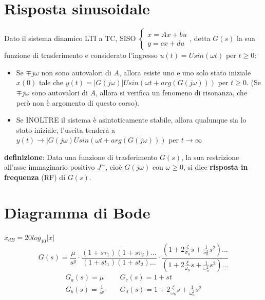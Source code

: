     \section{Risposta sinusoidale}
    Dato il sistema dinamico LTI a TC, SISO $\begin{cases}
        \dot{x} = Ax +bu\\ 
        y = cx +du
    \end{cases}$, detta $G(s)$ la sua funzione di trasferimento e considerato l'ingresso $u(t) = U sin(\omega t)$ per $t\geq 0$:
    \begin{itemize}
        \item Se $\mp j \omega$ non sono autovalori di $A$, allora esiste uno e uno solo stato iniziale $x(0)$ tale che $y(t) = |G(j \omega)| U sin(\omega t + arg(G(j \omega)))$ per $t\geq 0$. (Se $\mp j \omega$ sono autovalori di $A$, allora si verifica un fenomeno di risonanza, che però non è argomento di questo corso).
        \item Se INOLTRE il sistema è asintoticamente stabile, allora qualunque sia lo stato iniziale, l'uscita  tenderà a $y(t) \rightarrow |G(j \omega) U sin( \omega t + arg(G(j \omega)))$ per $t \rightarrow  \infty$
    \end{itemize}
    \textbf{definizione}:  Data una funzione di trasferimento $G(s)$, la sua restrizione all'asse immaginario positivo $J^+$, cioè $G(j \omega)$ con $\omega \geq 0$, si dice \textbf{risposta in frequenza} (RF) di $G(s)$.
    \newpage\section{Diagramma di Bode}
    $x_{dB} = 20 log_{10}|x|$\newline
    \[
        G(s) = \frac{\mu}{s^g} \cdot \frac{(1 + s \tau_1)(1 + s \tau_2)\dots}{(1 + s t_1)(1 + s t_2)\dots} \cdot \frac{(1 + 2 \frac{\zeta}{\sigma_n}s + \frac{1}{\sigma_n^2}s^2)\dots}{(1 + 2 \frac{\xi}{\omega_n} s + \frac{1}{\omega_n^2}s^2)\dots}
    \]
    \[
        \begin{matrix}
            G_a(s) = \mu & \;\; & G_c(s) = 1+ s t\\
            G_b(s) = \frac{1}{s^g} & \;\; & G_d(s) = 1 + 2 \frac{\xi}{\omega_n}s + \frac{1}{\omega_n^2}s^2
        \end{matrix}
    \]
